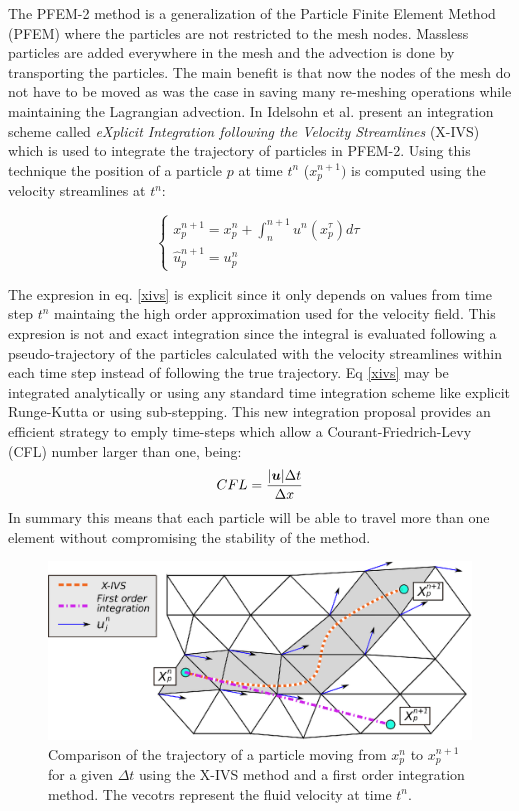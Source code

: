 The PFEM-2 method is a generalization of the Particle Finite Element Method (PFEM) \cite{sergio:pfem} where the particles are not restricted to the mesh nodes. Massless particles are added everywhere in the mesh and the advection is done by transporting the particles. The main benefit is that now the nodes of the mesh do not have to be moved as was the case in \cite{sergio:pfem} saving many re-meshing operations while maintaining the Lagrangian advection. In \cite{sergio:xivs1} Idelsohn et al. present an integration scheme called {\em eXplicit Integration following the Velocity Streamlines} (X-IVS) which is used to integrate the trajectory of particles in PFEM-2. Using this technique the position of a particle $p$ at time $t^n$ ($x_p^{n+1})$ is computed using the velocity streamlines at $t^n$:

\begin{equation}\label{xivs}
  \begin{cases}
    x_p^{n+1}=x_p^n+\int_n^{n+1} u^n(x_p^\tau) d\tau\\
    \hat{u}^{n+1}_p=u_p^n
  \end{cases}
\end{equation}

The expresion in eq. \ref{xivs} is explicit since it only depends on values from time step $t^n$ maintaing the high order approximation used for the velocity field. This expresion is not and exact integration since the integral is evaluated following a pseudo-trajectory of the particles calculated with the velocity streamlines within each time step instead of following the true trajectory. Eq \ref{xivs} may be integrated analytically or using any standard time integration scheme like explicit Runge-Kutta or using sub-stepping. This new integration proposal provides an efficient strategy to emply time-steps which allow a Courant-Friedrich-Levy (CFL) number larger than one, being:
\begin{equation}
  CFL=\frac{|\boldsymbol{u}|\Delta t}{\Delta x}
\end{equation}
In summary  this means that each particle will be able to travel more than one element without compromising the stability of the method.

\begin{figure}[htp] 
\centering 
\includegraphics[scale=.8]{./imgs/xivs.eps}
\caption{Comparison of the trajectory of a particle moving from $x_p^n$ to $x_p^{n+1}$ for a given $\Delta t$ using the X-IVS method and a first order integration method. The vecotrs represent the fluid velocity at time $t^n$.}
\label{fig:xivs}
\end{figure}

